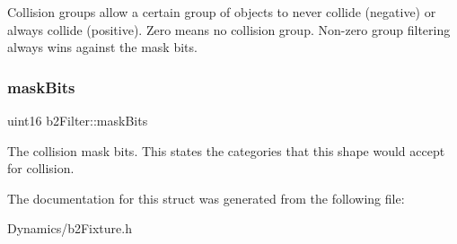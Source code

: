 Collision groups allow a certain group of objects to never collide (negative) or always collide (positive). Zero means no collision group. Non-\/zero group filtering always wins against the mask bits. \mbox{\label{structb2Filter_a533cccf85e3ba3d9e3700d73b819f6e2}} 
\subsubsection{\texorpdfstring{mask\+Bits}{maskBits}}
{\footnotesize\ttfamily uint16 b2\+Filter\+::mask\+Bits}

The collision mask bits. This states the categories that this shape would accept for collision. 

The documentation for this struct was generated from the following file\+:\begin{DoxyCompactItemize}
\item 
Dynamics/b2\+Fixture.\+h\end{DoxyCompactItemize}
